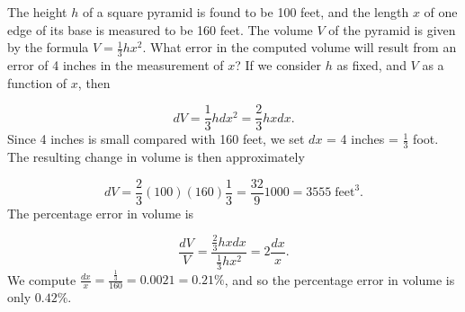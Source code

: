 
\begin{example}

The height $h$ of a square pyramid is found to be 100 feet, and the length $x$ of one edge of its base is measured to be 160 feet. The volume $V$ of the pyramid is given by the formula $V = \frac{1}{3}hx^2$.  What error in the computed
volume will result from an error of 4 inches in the measurement of $x$? If we consider $h$ as fixed, and $V$ as a function of $x$, then 

$$
dV = \frac{1}{3}h dx^2 = \frac{2}{3}hx dx.
$$
\noindent Since 4 inches is small compared with 160 feet, we set $dx$ = 4 inches = $\frac{1}{3}$ foot. The resulting change in volume is then approximately 

$$
dV = \frac{2}{3}(100)(160)\frac{1}{3} = \frac{32}{9} 1000 = 3555 \;\mbox{feet}^3.
$$
\noindent The percentage error in volume is

$$
 \frac{dV}{V} = \frac{ {\frac{2}{3}} hx dx}{{\frac{1}{3}}hx^2} = 2 \frac{dx}{x}.
$$
\noindent We compute $\frac{dx}{x} = \frac{\frac{1}{3}}{160} = 0.0021 = 0.21\%$, and so the percentage error in volume is only $0.42\%$.
\end{example}
